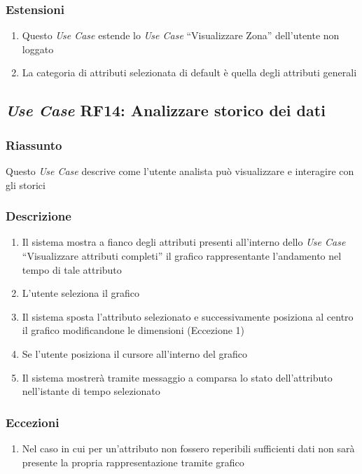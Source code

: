         \subsubsection{Estensioni}
            \begin{enumerate}
                \item Questo \textit{Use Case} estende lo \textit{Use Case} ``Visualizzare Zona'' dell'utente non loggato
                \item La categoria di attributi selezionata di default è quella degli attributi generali
            \end{enumerate}

    \subsection{\textit{Use Case} RF14: Analizzare storico dei dati}
        \subsubsection{Riassunto}
            Questo \textit{Use Case} descrive come l'utente analista può visualizzare e interagire con gli storici
        \subsubsection{Descrizione}
            \begin{enumerate}
                \item Il sistema mostra a fianco degli attributi presenti all'interno dello \textit{Use Case} ``Visualizzare attributi completi'' il grafico rappresentante l'andamento nel tempo di tale attributo
                \item L'utente seleziona il grafico
                \item Il sistema sposta l'attributo selezionato e successivamente posiziona al centro il grafico modificandone le dimensioni (Eccezione 1)
                \item Se l'utente posiziona il cursore all'interno del grafico
                \item Il sistema mostrerà tramite messaggio a comparsa lo stato dell'attributo nell'istante di tempo selezionato
            \end{enumerate}
        \subsubsection{Eccezioni}
            \begin{enumerate}
                \item Nel caso in cui per un'attributo non fossero reperibili sufficienti dati non sarà presente la propria rappresentazione tramite grafico
            \end{enumerate}


